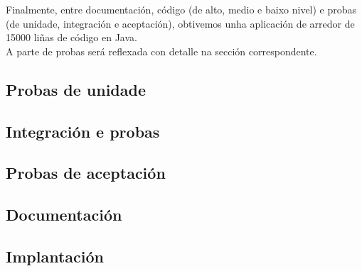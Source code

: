    Finalmente, entre documentación, código (de alto, medio e baixo nivel) e
   probas (de unidade, integración e aceptación), obtivemos unha aplicación de
   arredor de 15000 liñas de código en Java. \\
   
   A parte de probas será reflexada con detalle na sección correspondente.
   
 \subsection{Probas de unidade}
 

 \subsection{Integración e probas}

 \subsection{Probas de aceptación}
 
 \subsection{Documentación}

 \subsection{Implantación}
